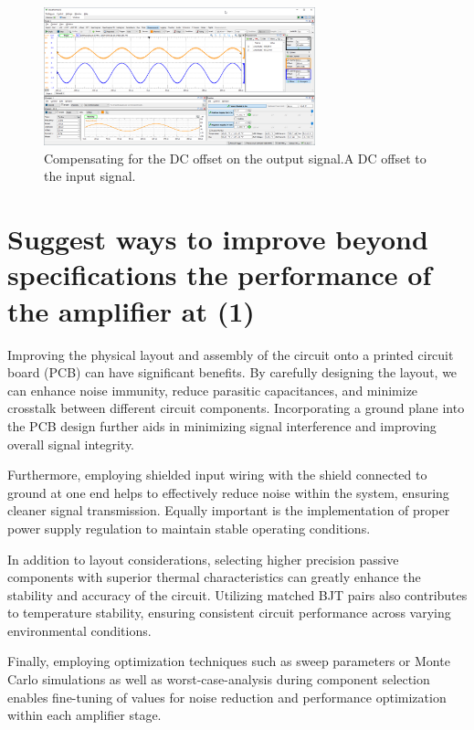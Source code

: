 \documentclass{article}
\begin{document}
	
	\begin{figure}[H]
	    \centering
	    \includegraphics[width=0.7\textwidth]{wfm-offset}
	    \caption{Compensating for the DC offset on the output signal.A DC offset to the input signal.}
	\end{figure}
	

	
	
	
	\section{Suggest ways to improve beyond specifications the performance of the amplifier at (1)}


Improving the physical layout and assembly of the circuit onto a printed circuit board (PCB) can have significant benefits. By carefully designing the layout, we can enhance noise immunity, reduce parasitic capacitances, and minimize crosstalk between different circuit components. Incorporating a ground plane into the PCB design further aids in minimizing signal interference and improving overall signal integrity.

Furthermore, employing shielded input wiring with the shield connected to ground at one end helps to effectively reduce noise within the system, ensuring cleaner signal transmission. Equally important is the implementation of proper power supply regulation to maintain stable operating conditions.

In addition to layout considerations, selecting higher precision passive components with superior thermal characteristics can greatly enhance the stability and accuracy of the circuit. Utilizing matched BJT pairs also contributes to temperature stability, ensuring consistent circuit performance across varying environmental conditions.

Finally, employing optimization techniques such as sweep parameters or Monte Carlo simulations as well as worst-case-analysis during component selection enables fine-tuning of values for noise reduction and performance optimization within each amplifier stage.
\end{document}
